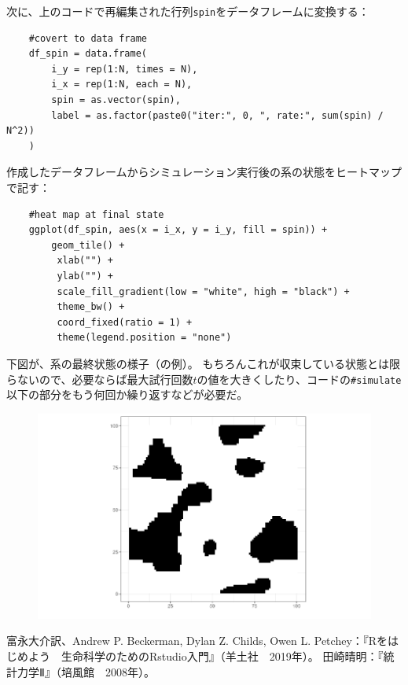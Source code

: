 \documentclass[fontsize = 12pt]{jlreq}
\begin{document}
次に、上のコードで再編集された行列\texttt{spin}をデータフレームに変換する：
\begin{lstlisting}
    #covert to data frame
    df_spin = data.frame(
        i_y = rep(1:N, times = N), 
        i_x = rep(1:N, each = N), 
        spin = as.vector(spin), 
        label = as.factor(paste0("iter:", 0, ", rate:", sum(spin) / N^2))
    )
\end{lstlisting}

作成したデータフレームからシミュレーション実行後の系の状態をヒートマップで記す：
\begin{lstlisting}
    #heat map at final state
    ggplot(df_spin, aes(x = i_x, y = i_y, fill = spin)) +
        geom_tile() +
         xlab("") +
         ylab("") +
         scale_fill_gradient(low = "white", high = "black") +
         theme_bw() +
         coord_fixed(ratio = 1) +
         theme(legend.position = "none")
\end{lstlisting}
下図が、系の最終状態の様子（の例）。
もちろんこれが収束している状態とは限らないので、必要ならば最大試行回数$t$の値を大きくしたり、コードの\texttt{\#simulate}以下の部分をもう何回か繰り返すなどが必要だ。
\begin{figure}[H] 
    \centering 
    \includegraphics[width=15cm]{f2.png}
\end{figure}%

\begin{thebibliography}{99}
 富永大介訳、Andrew P. Beckerman, Dylan Z. Childs, Owen L. Petchey：『Rをはじめよう　生命科学のためのRstudio入門』（羊土社　2019年）。
 田崎晴明：『統計力学Ⅱ』（培風館　2008年）。
\end{thebibliography}
\end{document}
